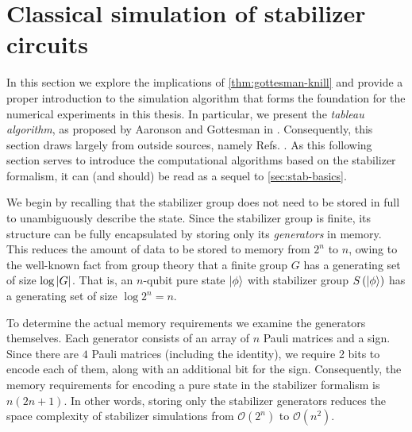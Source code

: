 \section{Classical simulation of stabilizer circuits}\label{sec:sim-stab}
In this section we explore the implications of \cref{thm:gottesman-knill} and
provide a proper introduction to the simulation algorithm that forms the
foundation for the numerical experiments in this thesis.  In particular, we
present the \emph{tableau algorithm}, as proposed by Aaronson and Gottesman in
\cite{aaronsonImprovedSimulationStabilizer2004}.  Consequently, this section
draws largely from outside sources, namely Refs.
\cite{aaronsonImprovedSimulationStabilizer2004, arabLectureNotesQuantum2024,
gottesmanStabilizerCodesQuantum1997,
gottesmanHeisenbergRepresentationQuantum1998}. As this following section serves
to introduce the computational algorithms based on the stabilizer formalism, it
can (and should) be read as a sequel to \cref{sec:stab-basics}.

We begin by recalling that the stabilizer group does not need to be stored in
full to unambiguously describe the state. Since the stabilizer group is finite,
its structure can be fully encapsulated by storing only its \emph{generators}
in memory. This reduces the amount of data to be stored to memory from $2^n$
to $n$, owing to the well-known fact from group theory that a finite group $G$
has a generating set of size $\log \abs{G}$. That is, an $n$-qubit pure state
$\ket{\phi}$ with stabilizer group $S\left(\ket{\phi}\right)$ has a generating
set of size $\log 2^n = n$.

To determine the actual memory requirements we examine the generators
themselves.  Each generator consists of an array of $n$ Pauli matrices and a
sign. Since there are $4$ Pauli matrices (including the identity), we require 2
bits to encode each of them, along with an additional bit for the sign.
Consequently, the memory requirements for encoding a pure state in the
stabilizer formalism is $n(2n+1)$. In other words, storing only the stabilizer
generators reduces the space complexity of stabilizer simulations from
$\mathcal{O}\left( 2^n \right)$ to $\mathcal{O}\left( n^2 \right)$.

